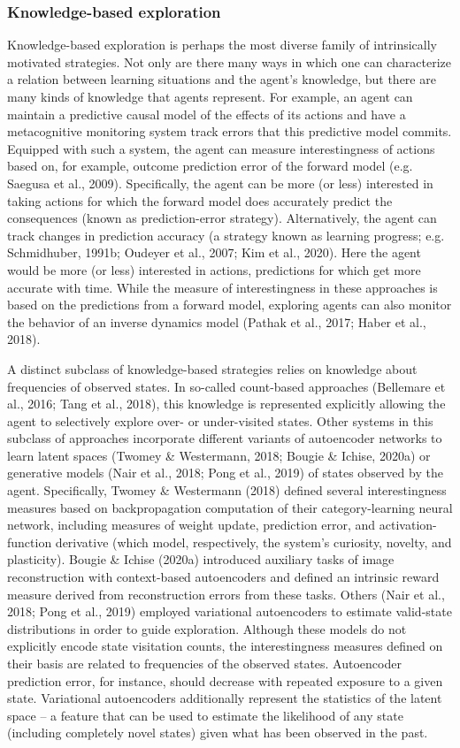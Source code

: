\subsubsection{Knowledge-based exploration}
Knowledge-based exploration is perhaps the most diverse family of intrinsically motivated strategies. Not only are there many ways in which one can characterize a relation between learning situations and the agent’s knowledge, but there are many kinds of knowledge that agents represent. For example, an agent can maintain a predictive causal model of the effects of its actions and have a metacognitive monitoring system track errors that this predictive model commits. Equipped with such a system, the agent can measure interestingness of actions based on, for example, outcome prediction error of the forward model (e.g. Saegusa et al., 2009). Specifically, the agent can be more (or less) interested in taking actions for which the forward model does accurately predict the consequences (known as prediction-error strategy). Alternatively, the agent can track changes in prediction accuracy (a strategy known as learning progress; e.g. Schmidhuber, 1991b; Oudeyer et al., 2007; Kim et al., 2020). Here the agent would be more (or less) interested in actions, predictions for which get more accurate with time. While the measure of interestingness in these approaches is based on the predictions from a forward model, exploring agents can also monitor the behavior of an inverse dynamics model (Pathak et al., 2017; Haber et al., 2018).

A distinct subclass of knowledge-based strategies relies on knowledge about frequencies of observed states. In so-called count-based approaches (Bellemare et al., 2016; Tang et al., 2018), this knowledge is represented explicitly allowing the agent to selectively explore over- or under-visited states. Other systems in this subclass of approaches incorporate different variants of autoencoder networks to learn latent spaces (Twomey \& Westermann, 2018; Bougie \& Ichise, 2020a) or generative models (Nair et al., 2018; Pong et al., 2019) of states observed by the agent. Specifically, Twomey \& Westermann (2018) defined several interestingness measures based on backpropagation computation of their category-learning neural network, including measures of weight update, prediction error, and activation-function derivative (which model, respectively, the system’s curiosity, novelty, and plasticity). Bougie \& Ichise (2020a) introduced auxiliary tasks of image reconstruction with context-based autoencoders and defined an intrinsic reward measure derived from reconstruction errors from these tasks. Others (Nair et al., 2018; Pong et al., 2019) employed variational autoencoders to estimate valid-state distributions in order to guide exploration. Although these models do not explicitly encode state visitation counts, the interestingness measures defined on their basis are related to frequencies of the observed states. Autoencoder prediction error, for instance, should decrease with repeated exposure to a given state. Variational autoencoders additionally represent the statistics of the latent space -- a feature that can be used to estimate the likelihood of any state (including completely novel states) given what has been observed in the past. 

